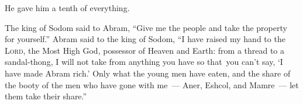 \begin{inparaenum}
  
  
  {\noindent He gave him a tenth of everything.}
  
   The king of Sodom said to Abram, ``Give me the people and take the property for yourself.''%
   Abram said to the king of Sodom, ``I have raised my hand to the \textsc{Lord}, the Most High God, possessor of Heaven and Earth:%
   from a thread to a sandal-thong, I will not take from anything you have so that\understood\ you can't say, `I have made Abram rich.'%
   Only what the young men have eaten, and the share of the booty of the men who have gone with me~--- Aner, Eshcol, and Mamre~--- let them take their share.''%
\end{inparaenum}

